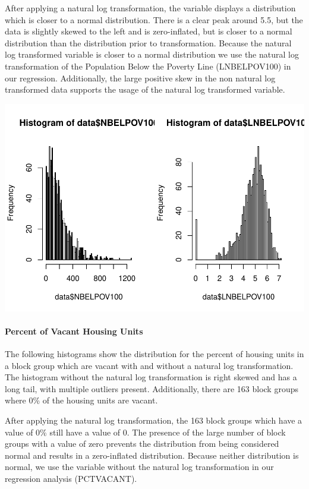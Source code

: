 \documentclass[
]{article}
\begin{document}
After applying a natural log transformation, the variable displays a
distribution which is closer to a normal distribution. There is a clear
peak around 5.5, but the data is slightly skewed to the left and is
zero-inflated, but is closer to a normal distribution than the
distribution prior to transformation. Because the natural log
transformed variable is closer to a normal distribution we use the
natural log transformation of the Population Below the Poverty Line
(LNBELPOV100) in our regression. Additionally, the large positive skew
in the non natural log transformed data supports the usage of the
natural log transformed variable.

\includegraphics{HW1-Regression_files/figure-latex/hist_NBELPOV100-1.pdf}

\hypertarget{percent-of-vacant-housing-units}{%
\paragraph{Percent of Vacant Housing
Units}\label{percent-of-vacant-housing-units}}

The following histograms show the distribution for the percent of
housing units in a block group which are vacant with and without a
natural log transformation. The histogram without the natural log
transformation is right skewed and has a long tail, with multiple
outliers present. Additionally, there are 163 block groups where 0\% of
the housing units are vacant.

After applying the natural log transformation, the 163 block groups
which have a value of 0\% still have a value of 0. The presence of the
large number of block groups with a value of zero prevents the
distribution from being considered normal and results in a zero-inflated
distribution. Because neither distribution is normal, we use the
variable without the natural log transformation in our regression
analysis (PCTVACANT).
\end{document}
